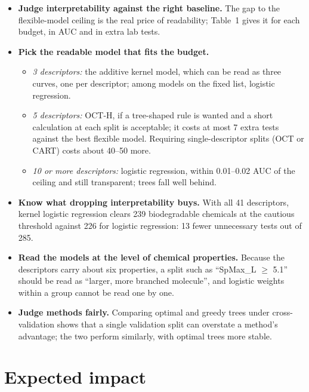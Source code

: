 \documentclass[11pt]{article}
\begin{document}
\begin{itemize}
  \item \textbf{Judge interpretability against the right baseline.} The gap to the flexible-model
        ceiling is the real price of readability; Table~1 gives it for each budget, in AUC and in
        extra lab tests.
  \item \textbf{Pick the readable model that fits the budget.}
        \begin{itemize}[itemsep=1pt]
          \item \emph{3 descriptors:} the additive kernel model, which can be read as three curves,
                one per descriptor; among models on the fixed list, logistic regression.
          \item \emph{5 descriptors:} OCT-H, if a tree-shaped rule is wanted and a short calculation
                at each split is acceptable; it costs at most 7 extra tests against the best flexible
                model. Requiring single-descriptor splits (OCT or CART) costs about 40--50 more.
          \item \emph{10 or more descriptors:} logistic regression, within 0.01--0.02 AUC of the
                ceiling and still transparent; trees fall well behind.
        \end{itemize}
  \item \textbf{Know what dropping interpretability buys.} With all 41 descriptors, kernel logistic
        regression clears 239 biodegradable chemicals at the cautious threshold against 226 for
        logistic regression: 13 fewer unnecessary tests out of 285.
  \item \textbf{Read the models at the level of chemical properties.} Because the descriptors carry
        about six properties, a split such as ``SpMax\_L $\geq$ 5.1'' should be read as ``larger,
        more branched molecule'', and logistic weights within a group cannot be read one by one.
  \item \textbf{Judge methods fairly.} Comparing optimal and greedy trees under cross-validation
        shows that a single validation split can overstate a method's advantage; the two perform
        similarly, with optimal trees more stable.
\end{itemize}

\section*{Expected impact}
\end{document}
